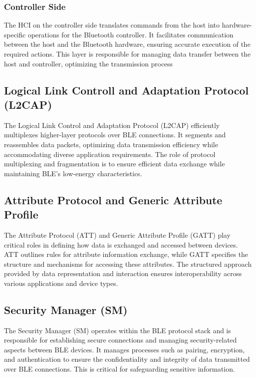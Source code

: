 \subsubsection{Controller Side}
The HCI on the controller side translates commands from the host into hardware-specific operations for the Bluetooth controller. It facilitates communication between the host and the Bluetooth hardware, ensuring accurate execution of the required actions. This layer is responsible for managing data transfer between the host and controller, optimizing the transmission process


\subsection{Logical Link Controll and Adaptation Protocol (L2CAP)}
The Logical Link Control and Adaptation Protocol (L2CAP) efficiently multiplexes higher-layer protocols over BLE connections. It segments and reassembles data packets, optimizing data transmission efficiency while accommodating diverse application requirements. The role of protocol multiplexing and fragmentation is to ensure efficient data exchange while maintaining BLE's low-energy characteristics.

\subsection{Attribute Protocol and Generic Attribute Profile}
The Attribute Protocol (ATT) and Generic Attribute Profile (GATT) play critical roles in defining how data is exchanged and accessed between devices. ATT outlines rules for attribute information exchange, while GATT specifies the structure and mechanisms for accessing these attributes. The structured approach provided by data representation and interaction ensures interoperability across various applications and device types.

\subsection{Security Manager (SM)}
The Security Manager (SM) operates within the BLE protocol stack and is responsible for establishing secure connections and managing security-related aspects between BLE devices. It manages processes such as pairing, encryption, and authentication to ensure the confidentiality and integrity of data transmitted over BLE connections. This is critical for safeguarding sensitive information.

